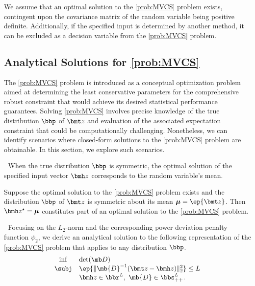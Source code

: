 \documentclass[opre, blindrev]{informs4}
\newcommand{\1}[1]{\mathds{1}{\left(#1\right)}}
\begin{document}
We assume that an optimal solution to the \ref{prob:MVCS} problem exists, contingent upon the covariance matrix of the random variable being positive definite. Additionally, if the specified input is determined by another method, it can be excluded as a decision variable from the \ref{prob:MVCS} problem.

\subsection*{Analytical Solutions for \ref{prob:MVCS}}

The \ref{prob:MVCS} problem is introduced as a conceptual optimization problem aimed at determining the least conservative parameters for the comprehensive robust constraint that would achieve its desired statistical performance guarantees. Solving \ref{prob:MVCS} involves precise knowledge of the true distribution $\bbp$ of $\bmt z$ and evaluation of the associated expectation constraint that could be computationally challenging. Nonetheless, we can identify scenarios where closed-form solutions to the \ref{prob:MVCS} problem are obtainable. In this section, we explore such scenarios.

\medskip
{} $\;$
When the true distribution $\bbp$ is symmetric, the optimal solution of the specified input vector $\bmh z$ corresponds to the random variable's mean. 
\begin{theorem}
\label{chap8:thm:MinVolSolutionSymmetric}
Suppose the optimal solution to the \ref{prob:MVCS} problem exists and the distribution $\bbp$ of $\bmt z$ is symmetric about its mean $\bm \mu = \ep{\bmt z}$. Then $\bmh z^\star=\bm \mu$ constitutes part of an optimal solution to the \ref{prob:MVCS} problem.
\end{theorem}

\medskip
{} $\;$
Focusing on the $L_2$-norm and the corresponding power deviation penalty function $\psi_2$, we derive an analytical solution to the following representation of the \ref{prob:MVCS} problem that applies to any distribution $\bbp$.
\begin{equation}
\label{prob:MVCSESpecial}
\begin{array}{cll}
\inf & \det(\mb D) \\
\subj & \ep{\|\mb{D}^{-1}( \bmt z - \bmh z) \|^2_2} \leq L \\
& \bmh z \in \bbr^L, \; \mb{D} \in \bbs^{L}_{++}.
\end{array} 
\end{equation}
\end{document}
